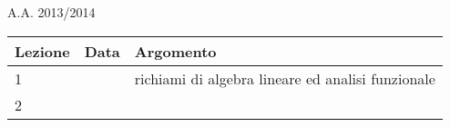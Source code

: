 \documentclass[a4paper, 12pt]{article}
\newcommand{\nr}{\\ \midrule}
\begin{document}
\newpage

\begin{section}{A.A. 2013/2014}

 \begin{tabular}{lll}
  \toprule

  Lezione & Data & Argomento\nr
  
  1 &  & richiami di algebra lineare ed analisi funzionale \nr
  2 &  & 





 \end{tabular}

\end{section}
\end{document}
